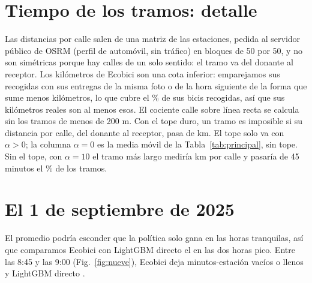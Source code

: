 \documentclass[conference,letterpaper,10pt]{IEEEtran}
\begin{document}
\section{Tiempo de los tramos: detalle}\label{ap:tramos}
Las distancias por calle salen de una matriz de las \tfEstaciones{} estaciones, pedida al servidor público de OSRM (perfil de automóvil, sin tráfico) en bloques de 50 por 50, y no son simétricas porque hay calles de un solo sentido: el tramo va del donante al receptor. Los kilómetros de Ecobici son una cota inferior: emparejamos sus recogidas con sus entregas de la misma foto o de la hora siguiente de la forma que sume menos kilómetros, lo que cubre el \caEcoEmpar\% de sus bicis recogidas, así que sus kilómetros reales son al menos esos. El cociente calle sobre línea recta se calcula sin los tramos de menos de 200 m. Con el tope duro, un tramo es imposible si su distancia por calle, del donante al receptor, pasa de \tfLimKm{} km. El tope solo va con $\alpha>0$; la columna $\alpha=0$ es la media móvil de la Tabla~\ref{tab:principal}, sin tope. Sin el tope, con $\alpha=10$ el tramo más largo mediría \tfSinDiezKmMax{} km por calle y pasaría de 45 minutos el \tfSinDiezPCuarentaCinco\% de los tramos.

\begin{table}[H]
\centering\footnotesize
\caption{Tiempo de los tramos donante $\to$ receptor en los \caDias{} días de prueba, media móvil por valor de $\alpha$; con $\alpha>0$, con el tope duro de \tfLimMin{} minutos.}
\label{tab:tramos}

\end{table}

\begin{table}[H]
\centering\footnotesize
\setlength{\tabcolsep}{2.5pt}
\caption{Tramos, distancias por calle y tramos largos en los \caDias{} días de prueba, media móvil por valor de $\alpha$.}
\label{tab:tramosap}

\end{table}

\section{El 1 de septiembre de 2025}\label{ap:mapas}
El promedio podría esconder que la política solo gana en las horas tranquilas, así que comparamos Ecobici con LightGBM directo el \rejDia{} en las dos horas pico. Entre las 8:45 y las 9:00 (Fig.~\ref{fig:nueve}), Ecobici deja \csEcoNueveEF{} minutos-estación vacíos o llenos y LightGBM directo \csLgbmNueveEF.
\end{document}

